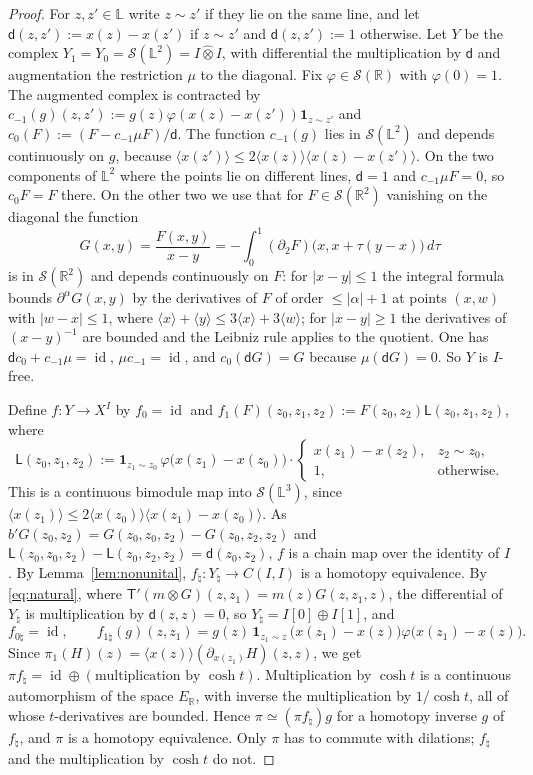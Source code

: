 \documentclass[11pt]{amsart}
\theoremstyle{definition}
\theoremstyle{remark}
\newcommand{\R}{\mathbb R}
\newcommand{\id}{\operatorname{id}}
\begin{document}
\begin{proof}
For $z,z'\in\mathbb L$ write $z\sim z'$ if they lie on the same line, and let
$\mathsf d(z,z'):=x(z)-x(z')$ if $z\sim z'$ and $\mathsf d(z,z'):=1$ otherwise.
Let $Y$ be the complex $Y_1=Y_0=\mathcal S(\mathbb L^{2})=I\widehat\otimes I$,
with differential the multiplication by $\mathsf d$ and augmentation the
restriction $\mu$ to the diagonal.  Fix $\varphi\in\mathcal S(\R)$ with
$\varphi(0)=1$.  The augmented complex is contracted by
$c_{-1}(g)(z,z'):=g(z)\varphi(x(z)-x(z'))\mathbf 1_{z\sim z'}$ and
$c_0(F):=(F-c_{-1}\mu F)/\mathsf d$.  The function $c_{-1}(g)$ lies in
$\mathcal S(\mathbb L^{2})$ and depends continuously on $g$, because
$\langle x(z')\rangle\le2\langle x(z)\rangle\langle x(z)-x(z')\rangle$.  On the two components of $\mathbb L^{2}$
where the points lie on different lines, $\mathsf d=1$ and $c_{-1}\mu F=0$, so
$c_0F=F$ there.  On the other two we use that for $F\in\mathcal S(\R^{2})$
vanishing on the diagonal the function
\[
G(x,y)=\frac{F(x,y)}{x-y}=-\int_0^1(\partial_2F)\bigl(x,x+\tau(y-x)\bigr)\,d\tau
\]
is in $\mathcal S(\R^{2})$ and depends continuously on $F$: for $|x-y|\le1$ the
integral formula bounds $\partial^{\alpha}G(x,y)$ by the derivatives of $F$ of
order $\le|\alpha|+1$ at points $(x,w)$ with $|w-x|\le1$, where
$\langle x\rangle+\langle y\rangle\le3\langle x\rangle+3\langle w\rangle$; for
$|x-y|\ge1$ the derivatives of $(x-y)^{-1}$ are bounded and the Leibniz rule
applies to the quotient.  One has $\mathsf dc_0+c_{-1}\mu=\id$,
$\mu c_{-1}=\id$, and $c_0(\mathsf dG)=G$ because $\mu(\mathsf dG)=0$.  So $Y$ is
$I$-free.

Define $f:Y\to X^{I}$ by $f_0=\id$ and
$f_1(F)(z_0,z_1,z_2):=F(z_0,z_2)\mathsf L(z_0,z_1,z_2)$, where
\[
\mathsf L(z_0,z_1,z_2):=\mathbf 1_{z_1\sim z_0}\,\varphi\bigl(x(z_1)-x(z_0)\bigr)\cdot
\begin{cases}x(z_1)-x(z_2),&z_2\sim z_0,\\ 1,&\text{otherwise.}\end{cases}
\]
This is a continuous bimodule map into $\mathcal S(\mathbb L^{3})$, since
$\langle x(z_1)\rangle\le2\langle x(z_0)\rangle\langle x(z_1)-x(z_0)\rangle$.
As $b'G(z_0,z_2)=G(z_0,z_0,z_2)-G(z_0,z_2,z_2)$ and
$\mathsf L(z_0,z_0,z_2)-\mathsf L(z_0,z_2,z_2)=\mathsf d(z_0,z_2)$, $f$ is a chain
map over the identity of $I$.  By Lemma~\ref{lem:nonunital}, $f_{\natural}:
Y_{\natural}\to C(I,I)$ is a homotopy equivalence.  By \eqref{eq:natural}, where
$\mathsf T'(m\otimes G)(z,z_1)=m(z)G(z,z_1,z)$, the differential of
$Y_{\natural}$ is multiplication by $\mathsf d(z,z)=0$, so
$Y_{\natural}=I[0]\oplus I[1]$, and
\[
f_{0\natural}=\id,\qquad
f_{1\natural}(g)(z,z_1)=g(z)\,\mathbf 1_{z_1\sim z}\,\bigl(x(z_1)-x(z)\bigr)
\varphi\bigl(x(z_1)-x(z)\bigr).
\]
Since $\pi_1(H)(z)=\langle x(z)\rangle(\partial_{x(z_1)}H)(z,z)$, we get
$\pi f_{\natural}=\id\oplus(\text{multiplication by }\cosh t)$.  Multiplication
by $\cosh t$ is a continuous automorphism of the space $E_{\R}$, with inverse
the multiplication by $1/\cosh t$, all of whose $t$-derivatives are bounded.
Hence $\pi\simeq(\pi f_{\natural})g$ for a homotopy inverse $g$ of
$f_{\natural}$, and $\pi$ is a homotopy equivalence.  Only $\pi$ has to commute
with dilations; $f_{\natural}$ and the multiplication by $\cosh t$ do not.
\end{proof}
\end{document}

